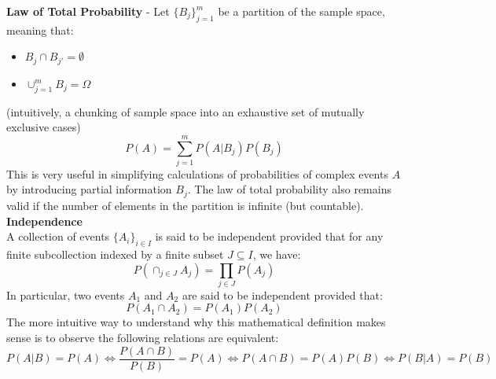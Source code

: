 \documentclass[12pt]{article}
\numberwithin{equation}{section}
\begin{document}
\textbf{Law of Total Probability} - Let $\{B_j\}_{j=1}^m$ be a partition of the sample space, meaning that:
\begin{itemize}
\item $B_j\cap B_{j'}=\emptyset$
\item $\cup_{j=1}^mB_j=\Omega$
\end{itemize}
(intuitively, a chunking of sample space into an exhaustive set of mutually exclusive cases)
$$P(A)=\sum_{j=1}^mP(A|B_j)P(B_j)$$
This is very useful in simplifying calculations of probabilities of complex events $A$ by introducing partial information $B_j$. The law of total probability also remains valid if the number of elements in the partition is infinite (but countable). \\

\textbf{Independence}\\
A collection of events $\{A_i\}_{i\in I}$ is said to be independent provided that for any finite subcollection indexed by a finite subset $J\subseteq I$, we have:
$$P(\cap_{j\in J}A_j)=\prod_{j\in J}P(A_j)$$
In particular, two events $A_1$ and $A_2$ are said to be independent provided that:
$$P(A_1\cap A_2)=P(A_1)P(A_2)$$
The more intuitive way to understand why this mathematical definition makes sense is to observe the following relations are equivalent:
$$P(A|B)=P(A)\iff \frac{P(A\cap B)}{P(B)}=P(A)\iff P(A\cap B)=P(A)P(B)\iff P(B|A)=P(B)$$
\end{document}
